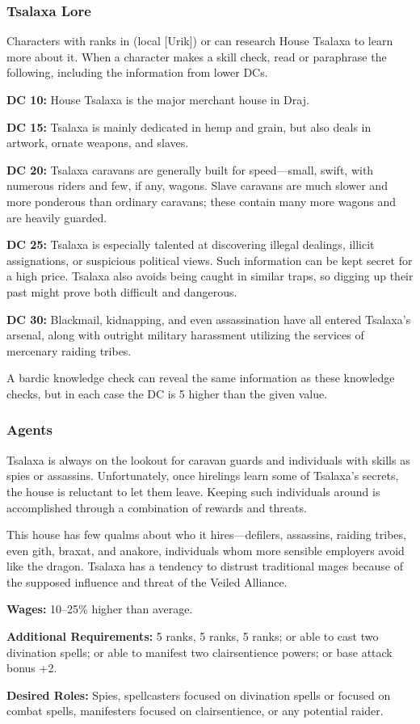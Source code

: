 \subsubsection{Tsalaxa Lore}
Characters with ranks in  (local [Urik]) or  can research House Tsalaxa to learn more about it. When a character makes a skill check, read or paraphrase the following, including the information from lower DCs.

\textbf{DC 10:} House Tsalaxa is the major merchant house in Draj.

\textbf{DC 15:} Tsalaxa is mainly dedicated in hemp and grain, but also deals in artwork, ornate weapons, and slaves.

\textbf{DC 20:} Tsalaxa caravans are generally built for speed---small, swift, with numerous riders and few, if any, wagons. Slave caravans are much slower and more ponderous than ordinary caravans; these contain many more wagons and are heavily guarded.

\textbf{DC 25:} Tsalaxa is especially talented at discovering illegal dealings, illicit assignations, or suspicious political views. Such information can be kept secret for a high price. Tsalaxa also avoids being caught in similar traps, so digging up their past might prove both difficult and dangerous.

\textbf{DC 30:} Blackmail, kidnapping, and even assassination have all entered Tsalaxa's arsenal, along with outright military harassment utilizing the services of mercenary raiding tribes.

A bardic knowledge check can reveal the same information as these knowledge checks, but in each case the DC is 5 higher than the given value.

\subsubsection{Agents}
Tsalaxa is always on the lookout for caravan guards and individuals with skills as spies or assassins. Unfortunately, once hirelings learn some of Tsalaxa's secrets, the house is reluctant to let them leave. Keeping such individuals around is accomplished through a combination of rewards and threats.

This house has few qualms about who it hires---defilers, assassins, raiding tribes, even gith, braxat, and anakore, individuals whom more sensible employers avoid like the dragon. Tsalaxa has a tendency to distrust traditional mages because of the supposed influence and threat of the Veiled Alliance.

\textbf{Wages:} 10--25\% higher than average.

\textbf{Additional Requirements:}  5 ranks,  5 ranks,  5 ranks; or able to cast two divination spells; or able to manifest two clairsentience powers; or base attack bonus +2.

\textbf{Desired Roles:} Spies, spellcasters focused on divination spells or focused on combat spells, manifesters focused on clairsentience, or any potential raider.
